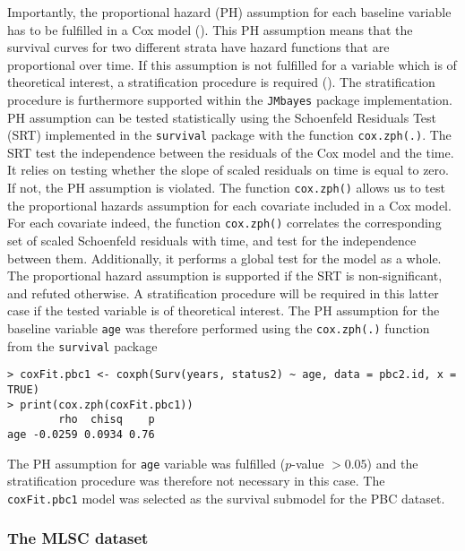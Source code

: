 \documentclass[12pt]{article}
\begin{document}
Importantly, the proportional hazard (PH) assumption for each baseline variable has to be fulfilled in a Cox model (\cite{cox1972}). This PH assumption means that the survival curves for two different strata have hazard functions that are proportional over time. If this assumption is not fulfilled for a variable which is of theoretical interest, a stratification procedure is required (\cite{fox2002cox}). The stratification procedure is furthermore supported within the \texttt{JMbayes} package implementation. PH assumption can be tested statistically using the Schoenfeld Residuals Test (SRT) implemented in the \texttt{survival} package with the function \texttt{cox.zph(.)}. The SRT test the independence between the residuals of the Cox model and the time. It relies on testing whether the slope of scaled residuals on time is equal to zero. If not, the PH assumption is violated. The function \texttt{cox.zph()} allows us to test the proportional hazards assumption for each covariate included in a Cox model. For each covariate indeed, the function \texttt{cox.zph()} correlates the corresponding set of scaled Schoenfeld residuals with time, and test for the independence between them. Additionally, it performs a global test for the model as a whole. The proportional hazard assumption is supported if the SRT is non-significant, and refuted otherwise. A stratification procedure will be required in this latter case if the tested variable is of theoretical interest.
The PH assumption for the baseline variable \texttt{age} was therefore performed using the \texttt{cox.zph(.)} function from the \texttt{survival} package
\begin{verbatim}
> coxFit.pbc1 <- coxph(Surv(years, status2) ~ age, data = pbc2.id, x = TRUE)
> print(cox.zph(coxFit.pbc1))
        rho  chisq    p
age -0.0259 0.0934 0.76
\end{verbatim}
The PH assumption for \texttt{age} variable was fulfilled ($p$-value $>0.05$) and the stratification procedure was therefore not necessary in this case. The \texttt{coxFit.pbc1} model was selected as the survival submodel for the PBC dataset.

\subsubsection{The MLSC dataset}
\label{survival mlsc}
\end{document}
